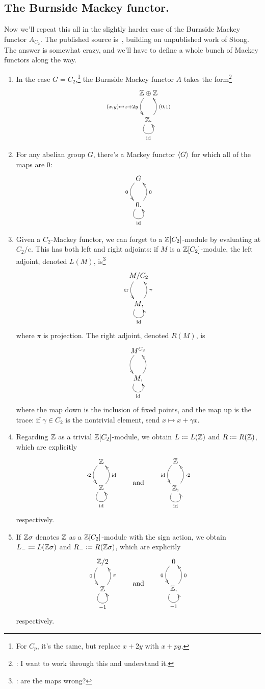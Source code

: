 \subsection*{The Burnside Mackey functor.}
Now we'll repeat this all in the slightly harder case of the Burnside Mackey functor $A_{C_2}$. The published
source is~\cite{Lew88}, building on unpublished work of Stong. The answer is somewhat crazy, and we'll have to
define a whole bunch of Mackey functors along the way.
\begin{beast}\hfill
\label{best_bestiary}
\begin{enumerate}
	\item In the case $G = C_2$,\footnote{For $C_p$, it's the same, but replace $x+2y$ with $x+py$.} the Burnside
	Mackey functor $A$ takes the form\footnote{\TODO: I want to work through this and understand it.}
	\[\xymatrix{
		\Z\oplus\Z\ar@/_0.4cm/[d]_{(x,y)\mapsto x+2y}\\
		\Z.\ar@(dl,dr)_\id\ar@/_0.4cm/[u]_{(0,1)}
	}\]
	\item For any abelian group $G$, there's a Mackey functor $\langle G\rangle$ for which all of the maps are $0$:
	\[\xymatrix{
		G\ar@/_0.4cm/[d]_0\\
		0.\ar@(dl,dr)_\id\ar@/_0.4cm/[u]_0
	}\]
	\item Given a $C_2$-Mackey functor, we can forget to a $\mathbb Z[C_2]$-module by evaluating at $C_2/e$. This has
	both left and right adjoints: if $M$ is a $\mathbb Z[C_2]$-module, the left adjoint, denoted $L(M)$, is\footnote{\TODO:
	are the maps wrong?}
	\[\xymatrix{
		M/C_2\ar@/_0.4cm/[d]_\tr\\
		M,\ar@(dl,dr)_\id\ar@/_0.4cm/[u]_\pi
	}\]
	where $\pi$ is projection. The right adjoint, denoted $R(M)$, is
	\[\xymatrix{
		M^{C_2}\ar@/_0.4cm/[d]\\
		M,\ar@(dl,dr)_\id\ar@/_0.4cm/[u]
	}\]
	where the map down is the inclusion of fixed points, and the map up is the trace: if $\gamma\in C_2$ is the
	nontrivial element, send $x\mapsto x+\gamma x$.
	\item Regarding $\mathbb Z$ as a trivial $\mathbb Z[C_2]$-module, we obtain $L\coloneqq L(\mathbb Z)$ and $R\coloneqq R(\mathbb Z)$, which
	are explicitly
	\[\gathxy{
		\Z\ar@/_0.4cm/[d]_{\cdot 2}\\
		\Z\ar@(dl,dr)_\id\ar@/_0.4cm/[u]_\id
	}\qquad\text{and}\qquad
	\gathxy{
		\Z\ar@/_0.4cm/[d]_\id\\
		\Z,\ar@(dl,dr)_\id\ar@/_0.4cm/[u]_{\cdot 2}
	}
	\]
	respectively.
	\item If $\mathbb Z\sigma$ denotes $\mathbb Z$ as a $\mathbb Z[C_2]$-module with the sign action, we obtain $L_-\coloneqq
	L(\mathbb Z\sigma)$ and $R_-\coloneqq R(\mathbb Z\sigma)$, which are explicitly
	\[\gathxy{
		\Z/2\ar@/_0.4cm/[d]_0\\
		\Z\ar@(dl,dr)_{-1}\ar@/_0.4cm/[u]_\pi
	}\qquad\text{and}\qquad
	\gathxy{
		0\ar@/_0.4cm/[d]_0\\
		\Z,\ar@(dl,dr)_{-1}\ar@/_0.4cm/[u]_0
	}
	\]
	respectively.
\end{enumerate}
\end{beast}
